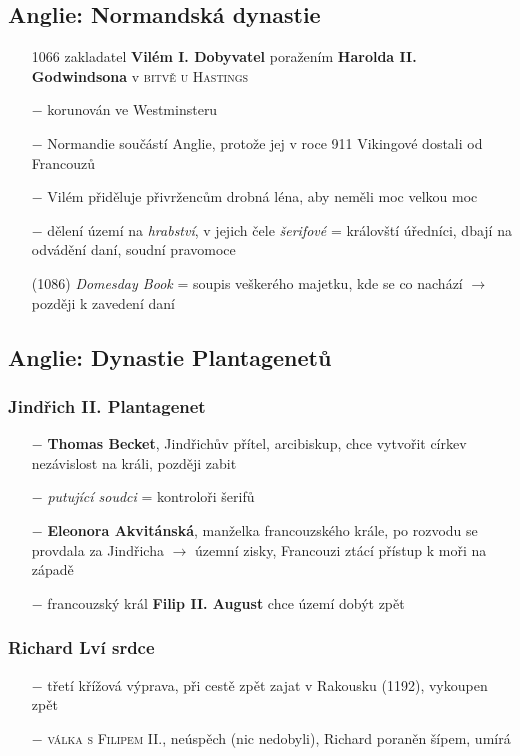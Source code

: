 \documentclass{article}
\begin{document}
\subsection*{Anglie: Normandská dynastie}
\begin{itemize}
    \vspace{-0.5em}
    \setlength\itemsep{0.15em}
    \item[1066] zakladatel \textbf{Vilém I. Dobyvatel} poražením \textbf{Harolda II. Godwindsona} v \textsc{bitvě u Hastings}
    \item[$-$] korunován ve Westminsteru
    \item[$-$] Normandie součástí Anglie, protože jej v roce 911 Vikingové dostali od Francouzů
    \item[$-$] Vilém přiděluje přivržencům drobná léna, aby neměli moc velkou moc
    \item[$-$] dělení území na \textit{hrabství}, v jejich čele \textit{šerifové} = královští úředníci, dbají na odvádění daní, soudní pravomoce
    \item[(1086)] \textit{Domesday Book} = soupis veškerého majetku, kde se co nachází $\rightarrow$ později k zavedení daní
\end{itemize}


\subsection*{Anglie: Dynastie Plantagenetů}
\subsubsection*{Jindřich II. Plantagenet}
\begin{itemize}
    \vspace{-0.5em}
    \setlength\itemsep{0.15em}
    \item[$-$] \textbf{Thomas Becket}, Jindřichův přítel, arcibiskup, chce vytvořit církev nezávislost na králi, později zabit
    \item[$-$] \textit{putující soudci} = kontroloři šerifů
    \item[$-$] \textbf{Eleonora Akvitánská}, manželka francouzského krále, po rozvodu se provdala za Jindřicha $\rightarrow$ územní zisky, Francouzi ztácí přístup k moři na západě
    \item[$-$] francouzský král \textbf{Filip II. August} chce území dobýt zpět
\end{itemize}
\subsubsection*{Richard Lví srdce}
\begin{itemize}
    \vspace{-0.5em}
    \setlength\itemsep{0.15em}
    \item[$-$] třetí křížová výprava, při cestě zpět zajat v Rakousku (1192), vykoupen zpět
    \item[$-$] \textsc{válka s Filipem II.}, neúspěch (nic nedobyli), Richard poraněn šípem, umírá
\end{itemize}
\end{document}
